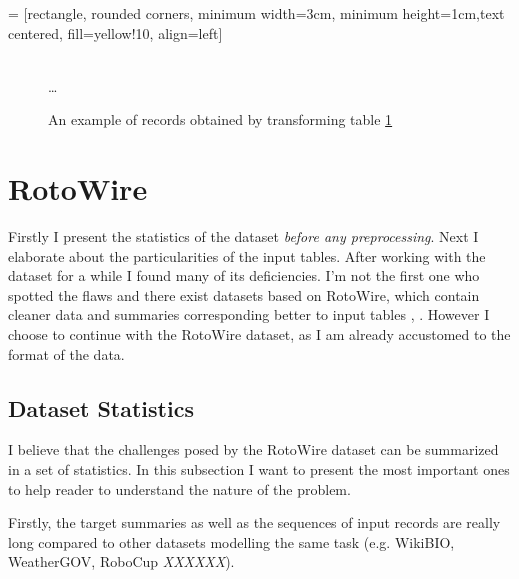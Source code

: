  = [rectangle, rounded corners, minimum width=3cm, minimum height=1cm,text centered, fill=yellow!10, align=left]

\begin{figure}[!h]
    \centering
    \usetikzlibrary{shapes.multipart}
    \\ \dots
    \caption{An example of records obtained by transforming table \ref{ex_seq_rec}} \label{ex_seq_rec}
\end{figure}

\section{RotoWire} \label{rotowire_preproc_section}

Firstly I present the statistics of the dataset \emph{before any preprocessing}. Next I elaborate about the particularities of the input tables. After working with the dataset for a while I found many of its deficiencies. I'm not the first one who spotted the flaws and there exist datasets based on RotoWire, which contain cleaner data and summaries corresponding better to input tables \citep{wang-2019-revisiting}, \citep{thomson-2020-sportsett}. However I choose to continue with the RotoWire dataset, as I am already accustomed to the format of the data.

\subsection{Dataset Statistics} \label{assumptions_ref}

I believe that the challenges posed by the RotoWire dataset can be summarized in a set of statistics. In this subsection I want to present the most important ones to help reader to understand the nature of the problem. 

Firstly, the target summaries as well as the sequences of input records are really long compared to other datasets modelling the same task (e.g. WikiBIO, WeatherGOV, RoboCup \emph{XXXXXX}).

